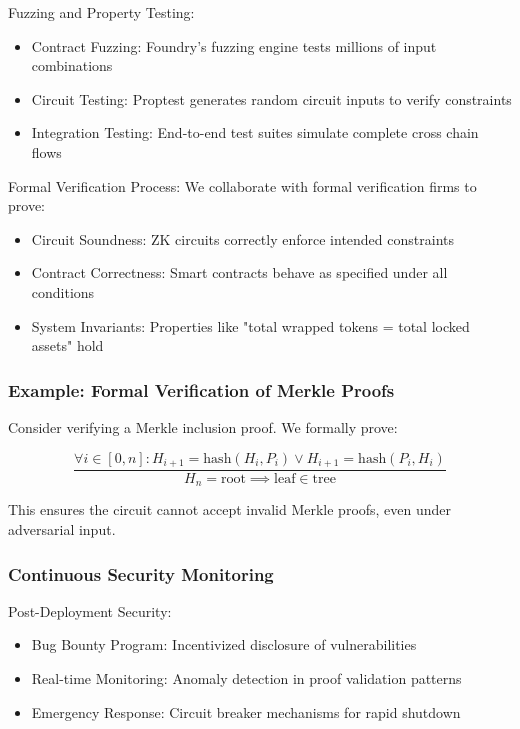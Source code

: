 \documentclass[11pt,a4paper]{article}
\begin{document}
Fuzzing and Property Testing:
\begin{itemize}
    \item Contract Fuzzing: Foundry's fuzzing engine tests millions of input combinations
    \item Circuit Testing: Proptest generates random circuit inputs to verify constraints
    \item Integration Testing: End-to-end test suites simulate complete cross chain flows
\end{itemize}

Formal Verification Process:
We collaborate with formal verification firms to prove:
\begin{itemize}
    \item Circuit Soundness: ZK circuits correctly enforce intended constraints
    \item Contract Correctness: Smart contracts behave as specified under all conditions
    \item System Invariants: Properties like "total wrapped tokens = total locked assets" hold
\end{itemize}

\subsubsection{Example: Formal Verification of Merkle Proofs}

Consider verifying a Merkle inclusion proof. We formally prove:

\[
\frac{\forall i \in [0, n]: H_{i+1} = \text{hash}(H_i, P_i) \lor H_{i+1} = \text{hash}(P_i, H_i)}{H_n = \text{root} \implies \text{leaf} \in \text{tree}}
\]

This ensures the circuit cannot accept invalid Merkle proofs, even under adversarial input.

\subsubsection{Continuous Security Monitoring}

Post-Deployment Security:
\begin{itemize}
    \item Bug Bounty Program: Incentivized disclosure of vulnerabilities
    \item Real-time Monitoring: Anomaly detection in proof validation patterns
    \item Emergency Response: Circuit breaker mechanisms for rapid shutdown
\end{itemize}
\end{document}
